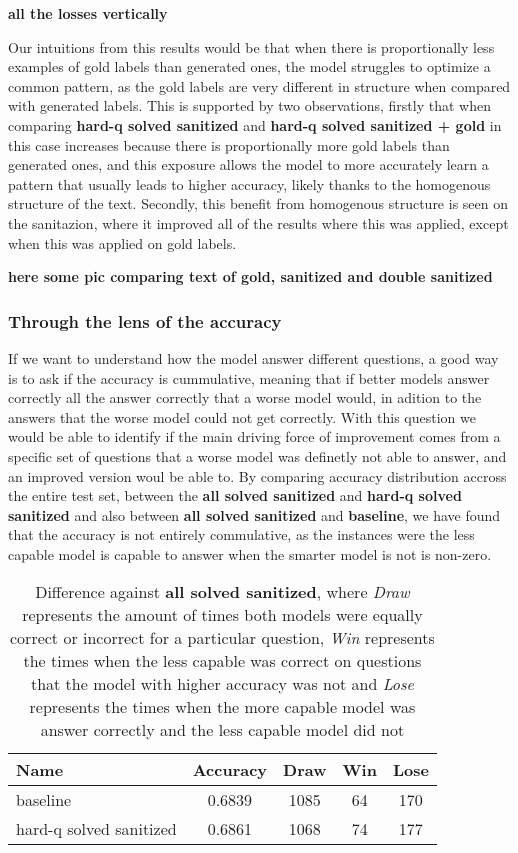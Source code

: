 \documentclass[a4paper,10pt]{article}
\begin{document}
\textbf{all the losses vertically}


Our intuitions from this results would be that when there is proportionally less examples of gold labels than generated ones, the model struggles to optimize a common pattern, as the gold labels are very different in structure when compared with generated labels. This is supported by two observations, firstly that when comparing \textbf{hard-q solved sanitized} and \textbf{hard-q solved sanitized + gold} in this case increases because there is proportionally more gold labels than generated ones, and this exposure allows the model to more accurately learn a pattern that usually leads to higher accuracy, likely thanks to the homogenous structure of the text. Secondly, this benefit from homogenous structure is seen on the sanitazion, where it improved all of the results where this was applied, except when this was applied on gold labels.

\textbf{here some pic comparing text of gold, sanitized and double sanitized}


\subsubsection{Through the lens of the accuracy}
If we want to understand how the model answer different questions, a good way is to ask if the accuracy is cummulative, meaning that if better models answer correctly all the answer correctly that a worse model would, in adition to the answers that the worse model could not get correctly. With this question we would be able to identify if the main driving force of improvement comes from a specific set of questions that a worse model was definetly not able to answer, and an improved version woul be able to. By comparing accuracy distribution accross the entire test set, between the \textbf{all solved sanitized} and \textbf{hard-q solved sanitized} and also between \textbf{all solved sanitized} and \textbf{baseline}, we have found that the accuracy is not entirely commulative, as the instances were the less capable model is capable to answer when the smarter model is not is non-zero. 
\begin{table}[ht]
\centering
 \begin{tabular}{|l|c|c|c|c|}
 \hline
 \textbf{Name} & \textbf{Accuracy} & \textbf{Draw} & \textbf{Win} & \textbf{Lose}\\
 \hline
 baseline & 0.6839 & 1085 & 64 & 170 \\
 hard-q solved sanitized & 0.6861 & 1068 & 74 & 177\\
 \hline
 \end{tabular}
 \caption{Difference against \textbf{all solved sanitized}, where \textit{Draw} represents the amount of times both models were equally correct or incorrect for a particular question, \textit{Win} represents the times when the less capable was correct on questions that the model with higher accuracy was not and \textit{Lose} represents the times when the more capable model was answer correctly and the less capable model did not}
\end{table}
\end{document}
